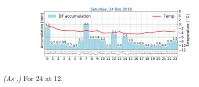 \begin{figure}[ht!]
	\begin{subfigure}[b]{0.49\textwidth}
		\includegraphics[trim={4.9cm 1.cm 1.5cm 1cm},clip,
		width=\textwidth]{./fig_weathermast/T_P_U_20161224}
		\caption{} \label{fig:TPU24}
	\end{subfigure}
	\caption{\textit{(As .)} For \SI{24}{\dec} at \SI{12}{\UTC}.}\label{fig:weather:24}
\end{figure}

\newpage
